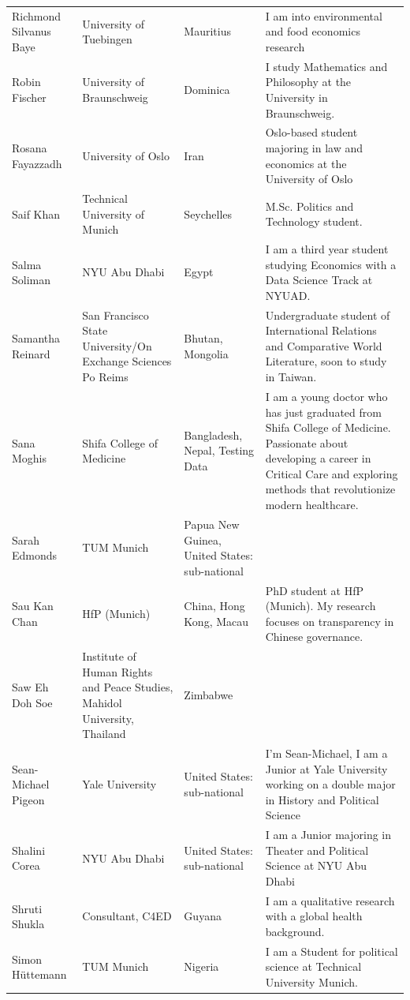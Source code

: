 \documentclass[]{article}
\begin{document}
\begin{longtable}{l>{\raggedright\arraybackslash}p{2cm}>{\raggedright\arraybackslash}p{2cm}>{\raggedright\arraybackslash}p{3cm}}
\addlinespace
Richmond Silvanus Baye & University of Tuebingen & Mauritius & I am into environmental and food economics research\\
\rowcolor{gray!6}  Robin Fischer & University of Braunschweig & Dominica & I study Mathematics and Philosophy at the University in Braunschweig.\\
Rosana Fayazzadh & University of Oslo & Iran & Oslo-based student majoring in law and economics at the University of Oslo\\
\rowcolor{gray!6}  Saif Khan & Technical University of Munich & Seychelles & M.Sc. Politics and Technology student.\\
Salma Soliman & NYU Abu Dhabi & Egypt & I am a third year student studying Economics with a Data Science Track at NYUAD.\\
\addlinespace
\rowcolor{gray!6}  Samantha Reinard & San Francisco State University/On Exchange Sciences Po Reims & Bhutan, Mongolia & Undergraduate student of International Relations and Comparative World Literature, soon to study in Taiwan.\\
Sana Moghis & Shifa College of Medicine & Bangladesh, Nepal, Testing Data & I am a young doctor who has just graduated from Shifa College of Medicine. Passionate about developing a career in Critical Care and exploring methods that revolutionize modern healthcare.\\
\rowcolor{gray!6}  Sarah Edmonds & TUM Munich & Papua New Guinea, United States: sub-national & \\
Sau Kan Chan & HfP (Munich) & China, Hong Kong, Macau & PhD student at HfP (Munich). My research focuses on transparency in Chinese governance.\\
\rowcolor{gray!6}  Saw Eh Doh Soe & Institute of Human Rights and Peace Studies, Mahidol University, Thailand & Zimbabwe & \\
\addlinespace
Sean-Michael Pigeon & Yale University & United States: sub-national & I'm Sean-Michael, I am a Junior at Yale University working on a double major in History and Political Science\\
\rowcolor{gray!6}  Shalini Corea & NYU Abu Dhabi & United States: sub-national & I am a Junior majoring in Theater and Political Science at NYU Abu Dhabi\\
Shruti Shukla & Consultant, C4ED & Guyana & I am a qualitative research with a global health background.\\
\rowcolor{gray!6}  Simon Hüttemann & TUM Munich & Nigeria & I am a Student for political science at Technical University Munich.\\

\end{longtable}
\end{document}
